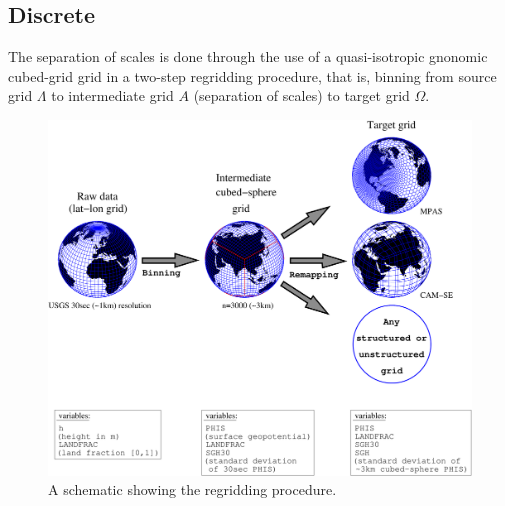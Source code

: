 \documentclass[gmd]{copernicus}
\begin{document}
{\color{red}{[julio: continuous definition of dominant orientation of topography with this notation?]}}
\subsection{Discrete}\label{sec:discrete}
The separation of scales is done through the use of a quasi-isotropic gnonomic cubed-grid grid in a two-step regridding procedure, that is, binning from source grid $\Lambda$ to intermediate grid $A$ (separation of scales) to target grid $\Omega$. 

\begin{figure}[t]
\vspace*{2mm}
\begin{center}
\includegraphics[width=12cm]{fig/schematic}
\end{center}
  \caption{A schematic showing the regridding procedure.}\label{fig:schematic}
\end{figure}
\end{document}
